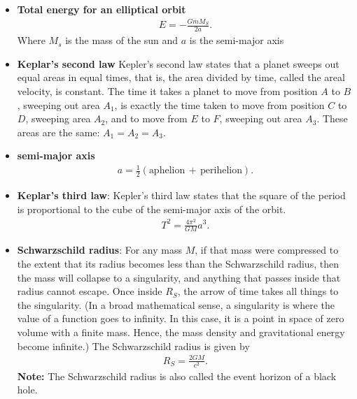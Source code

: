 \documentclass{report}
\begin{document}
\begin{itemize}
        \item \textbf{Total energy for an elliptical orbit}
            \begin{align*}
                E = -\frac{GmM_{S}}{2a}
            .\end{align*}
            Where $M_{s}$ is the mass of the sun and $a$ is the semi-major axis
    \item \textbf{Keplar's second law}
        Kepler’s second law states that a planet sweeps out equal areas in equal times, that is, the area divided by time, called the areal velocity, is constant.
        \bigbreak \noindent 
        \bigbreak \noindent 
        The time it takes a planet to move from position \(A\) to \(B\), sweeping out area \(A_1\), is exactly the time taken to move from position \(C\) to \(D\), sweeping area \(A_2\), and to move from \(E\) to \(F\), sweeping out area \(A_3\). These areas are the same: \(A_1 = A_2 = A_3\).
    \item \textbf{semi-major axis}
        \begin{align*}
            a = \frac{1}{2}(\text{aphelion}\, + \, \text{perihelion})
        .\end{align*}
    \item \textbf{Keplar's third law}: Kepler’s third law states that the square of the period is proportional to the cube of the semi-major axis of the orbit. 
        \begin{align*}
            T^{2} = \frac{4\pi^{2}}{GM}a^{3}            
        .\end{align*}
    \item \textbf{Schwarzschild radius}:
        For any mass $M$, if that mass were compressed to the extent that its radius becomes less than the Schwarzschild radius, then the mass will collapse to a singularity, and anything that passes inside that radius cannot escape. Once inside $R_{S}$, the arrow of time takes all things to the singularity. (In a broad mathematical sense, a singularity is where the value of a function goes to infinity. In this case, it is a point in space of zero volume with a finite mass. Hence, the mass density and gravitational energy become infinite.) The Schwarzschild radius is given by
        \begin{align*}
            R_{S} = \frac{2GM}{c^{2}}
        .\end{align*}
        \bigbreak \noindent 
        \textbf{Note:} The Schwarzschild radius is also called the event horizon of a black hole.
    \end{itemize}
\end{document}
